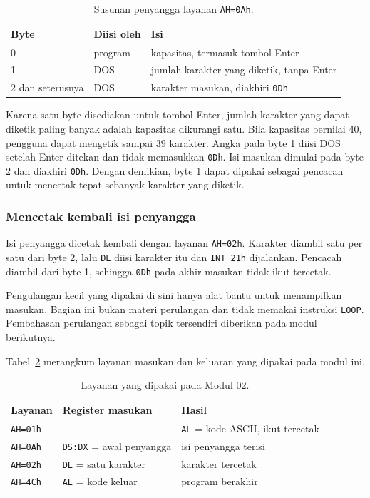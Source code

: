 \begin{table}[H]
    \centering
    \caption{Susunan penyangga layanan \texttt{AH=0Ah}.}
    \label{tab:m02-buffer}
    \small
    \begin{tabular}{@{}lll@{}}
        \toprule
        \textbf{Byte} & \textbf{Diisi oleh} & \textbf{Isi} \\
        \midrule
        0 & program & kapasitas, termasuk tombol Enter \\
        1 & DOS & jumlah karakter yang diketik, tanpa Enter \\
        2 dan seterusnya & DOS & karakter masukan, diakhiri \texttt{0Dh} \\
        \bottomrule
    \end{tabular}
\end{table}

Karena satu byte disediakan untuk tombol Enter, jumlah karakter yang
dapat diketik paling banyak adalah kapasitas dikurangi satu. Bila
kapasitas bernilai 40, pengguna dapat mengetik sampai 39 karakter.
Angka pada byte 1 diisi DOS setelah Enter ditekan dan tidak
memasukkan \texttt{0Dh}. Isi masukan dimulai pada byte 2 dan diakhiri
\texttt{0Dh}. Dengan demikian, byte 1 dapat dipakai sebagai pencacah
untuk mencetak tepat sebanyak karakter yang diketik.

\subsubsection*{Mencetak kembali isi penyangga}

Isi penyangga dicetak kembali dengan layanan \texttt{AH=02h}.
Karakter diambil satu per satu dari byte 2, lalu \texttt{DL} diisi
karakter itu dan \texttt{INT 21h} dijalankan. Pencacah diambil dari
byte 1, sehingga \texttt{0Dh} pada akhir masukan tidak ikut tercetak.

Pengulangan kecil yang dipakai di sini hanya alat bantu untuk
menampilkan masukan. Bagian ini bukan materi perulangan dan tidak
memakai instruksi \texttt{LOOP}. Pembahasan perulangan sebagai topik
tersendiri diberikan pada modul berikutnya.

Tabel~\ref{tab:m02-layanan} merangkum layanan masukan dan keluaran
yang dipakai pada modul ini.

\begin{table}[H]
    \centering
    \caption{Layanan yang dipakai pada Modul 02.}
    \label{tab:m02-layanan}
    \small
    \begin{tabular}{@{}lll@{}}
        \toprule
        \textbf{Layanan} & \textbf{Register masukan} & \textbf{Hasil} \\
        \midrule
        \texttt{AH=01h} & -- & \texttt{AL} = kode ASCII, ikut tercetak \\
        \texttt{AH=0Ah} & \texttt{DS:DX} = awal penyangga &
        isi penyangga terisi \\
        \texttt{AH=02h} & \texttt{DL} = satu karakter &
        karakter tercetak \\
        \texttt{AH=4Ch} & \texttt{AL} = kode keluar &
        program berakhir \\
        \bottomrule
    \end{tabular}
\end{table}

